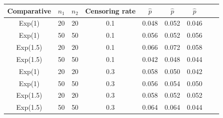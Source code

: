 \documentclass[11pt]{article}
\begin{document}
\begin{appendices}
\begin{table}[H]
{\begin{tabular}{ccccccccc}
				Comparative	& $n_1$ & $n_2$ & Censoring rate   &  $\hat{p}$ & $\hat{p}$ & $\hat{p}$ 
				
				\\ 
				
				
				\hline
				Exp(1) & 20 & 20 & 0.1 & 0.048 &  0.052 & 0.046 &  \\ 
				Exp(1) & 50 & 50 & 0.1 & 0.056  & 0.052 & 0.056   \\ 
				Exp(1.5) & 20 & 20  & 0.1 &  0.066  & 0.072 & 0.058  \\ 
				Exp(1.5) & 50 & 50 & 0.1 & 0.042  & 0.048 & 0.044 \\ 
				Exp(1) & 20 & 20 & 0.3 & 0.058  & 0.050 & 0.042  \\ 
				Exp(1) & 50 & 50 &  0.3 & 0.056 & 0.054 & 0.050  \\ 
				Exp(1.5) & 20 & 20 & 0.3 & 0.058 & 0.052 & 0.052   \\ 
				Exp(1.5) & 50 & 50 & 0.3 & 0.064 & 0.064 & 0.044  \\
				\hline
			\end{tabular}} 
			\label{fig:n11}	
		\end{table}

		
		
		
		
		
		\begin{table}[H]

			\caption{				\label{append:tab:tabla4}  Proportion $p$-values less or equal $0.05$ Gamma distribution nunder the null hypothesis}
			\centering
\end{table}
\end{appendices}
\end{document}
